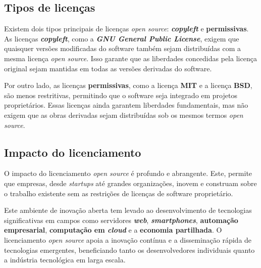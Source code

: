 \subsection{Tipos de licenças}
Existem dois tipos principais de licenças \textit{open source}: \textbf{\textit{copyleft}} e \textbf{permissivas}. As licenças \textbf{\textit{copyleft}}, como a \textbf{\textit{GNU General Public License}}, exigem que quaisquer versões
modificadas do software também sejam distribuídas com a mesma licença \textit{open source}. Isso garante que as liberdades concedidas pela licença original sejam mantidas em todas as versões derivadas do software. 
\par \vspace{6pt}
Por outro lado, as licenças \textbf{permissivas}, como a licença \textbf{MIT} e a licença \textbf{BSD}, são menos restritivas, permitindo que o software seja integrado em projetos proprietários. 
Essas licenças ainda garantem liberdades fundamentais, mas não exigem que as obras derivadas sejam distribuídas sob os mesmos termos \textit{open source}.

\subsection{Impacto do licenciamento}
O impacto do licenciamento \textit{open source} é profundo e abrangente. Este, permite que empresas, desde \textit{startups} até grandes organizações, inovem e construam sobre o trabalho existente sem as 
restrições de licenças de software proprietário.
\par \vspace{6pt}
Este ambiente de inovação aberta tem levado ao desenvolvimento de tecnologias significativas em campos como servidores \textbf{\textit{web}}, \textbf{\textit{smartphones}}, \textbf{automação empresarial}, \textbf{computação em \textit{cloud}} e a \textbf{economia partilhada}. 
O licenciamento \textit{open source} apoia a inovação contínua e a disseminação rápida de tecnologias emergentes, beneficiando tanto os desenvolvedores individuais quanto a indústria tecnológica em larga escala.
